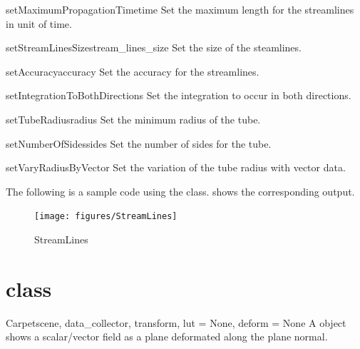 \begin{methoddesc}[StreamLines]{setMaximumPropagationTime}{time}
Set the maximum length for the streamlines in unit of time.
\end{methoddesc}

\begin{methoddesc}[StreamLines]{setStreamLinesSize}{stream_lines_size}
Set the size of the steamlines.
\end{methoddesc}

\begin{methoddesc}[StreamLines]{setAccuracy}{accuracy}
Set the accuracy for the streamlines.
\end{methoddesc}

\begin{methoddesc}[StreamLines]{setIntegrationToBothDirections}{}
Set the integration to occur in both directions.
\end{methoddesc}

\begin{methoddesc}[StreamLines]{setTubeRadius}{radius}
Set the minimum radius of the tube.
\end{methoddesc}

\begin{methoddesc}[StreamLines]{setNumberOfSides}{sides}
Set the number of sides for the tube.
\end{methoddesc}

\begin{methoddesc}[StreamLines]{setVaryRadiusByVector}{}
Set the variation of the tube radius with vector data.
\end{methoddesc}

The following is a sample code using the \StreamLines class.
 shows the corresponding output.


\begin{figure}[ht]
\begin{center}
\texttt{[image: figures/StreamLines]}
\end{center}
\caption{StreamLines}
\label{fig:streamlines.1}
\end{figure}

\section{\Carpet class}
\begin{classdesc}{Carpet}{scene, data_collector, transform, lut = None, 
deform = None}
A \Carpet object shows a scalar/vector field as a plane deformated along 
the plane normal.
\end{classdesc}

